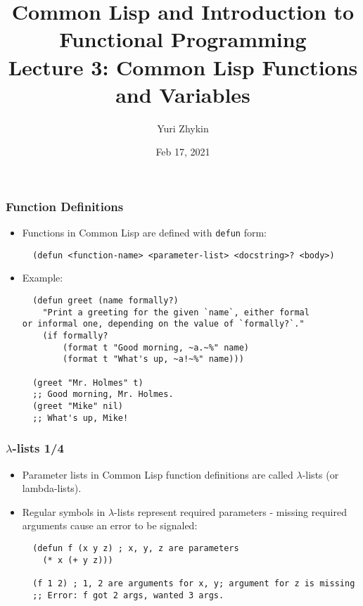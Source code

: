 \documentclass{beamer}
\title{
  Common Lisp and Introduction to Functional Programming \\
  Lecture 3: Common Lisp Functions and Variables
}
\author{Yuri Zhykin}
\date{Feb 17, 2021}
\begin{document}
\frame{\titlepage}

\begin{frame}[fragile]
  \frametitle{Function Definitions}
  \begin{itemize}
  \item Functions in Common Lisp are defined with \texttt{defun} form:
\begin{verbatim}
  (defun <function-name> <parameter-list> <docstring>? <body>)
\end{verbatim}
  \item Example:
\begin{verbatim}
  (defun greet (name formally?)
    "Print a greeting for the given `name`, either formal
or informal one, depending on the value of `formally?`."
    (if formally?
        (format t "Good morning, ~a.~%" name) 
        (format t "What's up, ~a!~%" name)))

  (greet "Mr. Holmes" t)
  ;; Good morning, Mr. Holmes.
  (greet "Mike" nil)
  ;; What's up, Mike!
\end{verbatim}
  \end{itemize}
\end{frame}

\begin{frame}[fragile]
  \frametitle{$\lambda$-lists 1/4}
  \begin{itemize}
  \item Parameter lists in Common Lisp function definitions are called
    $\lambda$-lists (or lambda-lists).
  \item Regular symbols in $\lambda$-lists represent required parameters -
    missing required arguments cause an error to be signaled:
\begin{verbatim}
  (defun f (x y z) ; x, y, z are parameters
    (* x (+ y z)))

  (f 1 2) ; 1, 2 are arguments for x, y; argument for z is missing
  ;; Error: f got 2 args, wanted 3 args.
\end{verbatim}
  \end{itemize}
\end{frame}
\end{document}
